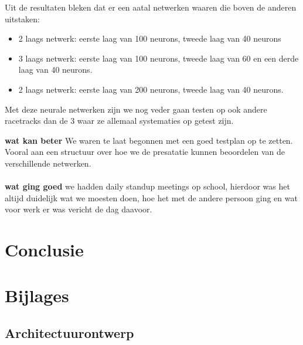 \documentclass{article}
\begin{document}

Uit de resultaten bleken dat er een aatal netwerken waaren die boven de anderen uitstaken:
\begin{itemize}
\item 2 laags netwerk: eerste laag van 100 neurons, tweede laag van 40 neurons
\item 3 laags netwerk: eerste laag van 100 neurons, tweede laag van 60 en een derde laag van 40 neurons.
\item 2 laags netwerk: eerste laag van 200 neurons, tweede laag van 40 neurons. 
\end{itemize}
Met deze neurale netwerken zijn we nog veder gaan testen op ook andere racetracks dan de 3 waar ze allemaal systematies op getest zijn.


		

\textbf{wat kan beter}
We waren te laat begonnen met een goed testplan op te zetten. Vooral aan een structuur over hoe we de presatatie kunnen beoordelen van de verschillende netwerken. \\\\

\textbf{wat ging goed}
we hadden daily standup meetings op school, hierdoor was het altijd duidelijk wat we moesten doen, hoe het met de andere persoon ging en wat voor werk er was vericht de dag daavoor.



\section{Conclusie}
\pagebreak
\section{Bijlages}
\subsection{Architectuurontwerp}

\pagebreak

\end{document}
